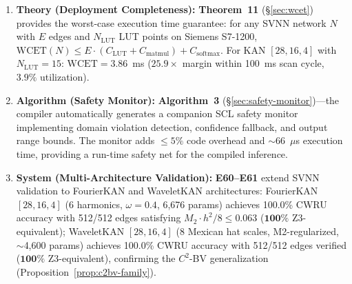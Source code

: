 \documentclass[journal,onecolumn]{IEEEtran}
\begin{document}
\begin{enumerate}
         the \textbf{Operation Separation Principle}---the $C^2$-BV
         architecture family (B-spline, Fourier, Wavelet, RBF, Chebyshev)
         all admit SVNN guarantees; standard MLPs are structurally excluded.
    \item \textbf{Theory (Deployment Completeness):}
          \textbf{Theorem~11} ({\S}\ref{sec:wcet}) provides the worst-case
         execution time guarantee: for any SVNN network $N$ with $E$ edges
         and $N_{\text{LUT}}$ LUT points on Siemens S7-1200,
          $\text{WCET}(N) \leq E \cdot (C_{\text{LUT}} + C_{\text{matmul}})
          + C_{\text{softmax}}$. For KAN $[28,16,4]$ with $N_{\text{LUT}}=15$:
          $\text{WCET} = 3.86$~ms ($25.9\times$ margin within 100~ms scan
         cycle, $3.9\%$ utilization).
    \item \textbf{Algorithm (Safety Monitor):} \textbf{Algorithm~3}
          ({\S}\ref{sec:safety-monitor})---the compiler automatically
         generates a companion SCL safety monitor implementing domain
         violation detection, confidence fallback, and output range
         bounds. The monitor adds $\leq 5\%$ code overhead and
          $\sim 66$~$\mu$s execution time, providing a run-time safety
         net for the compiled inference.
    \item \textbf{System (Multi-Architecture Validation):}
          \textbf{E60--E61} extend SVNN validation to FourierKAN
         and WaveletKAN architectures: FourierKAN $[28,16,4]$ (6 harmonics,
          $\omega=0.4$, 6,676 params) achieves 100.0\% CWRU accuracy with
          512/512 edges satisfying $M_2 \cdot h^2 / 8 \leq 0.063$
          ($\mathbf{100\%}$ Z3-equivalent);
         WaveletKAN $[28,16,4]$ (8 Mexican hat scales, M2-regularized,
          $\sim$4,600 params)
         achieves 100.0\% CWRU accuracy with 512/512 edges verified
          ($\mathbf{100\%}$ Z3-equivalent), confirming the $C^2$-BV
         generalization (Proposition~\ref{prop:c2bv-family}).


\end{enumerate}
\end{document}
